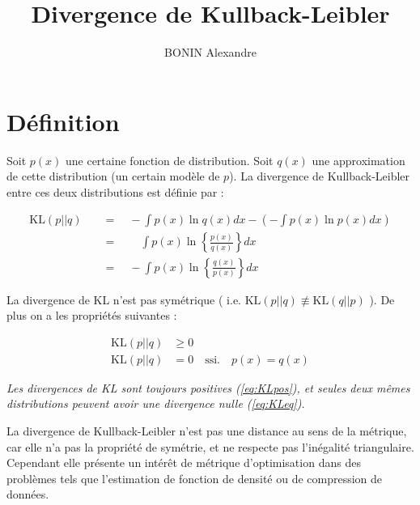 \documentclass[french]{article}
\title{Divergence de Kullback-Leibler}
\author{BONIN Alexandre}
\begin{document}
\maketitle

\tableofcontents

\section{Définition}

Soit $p(x)$ une certaine fonction de distribution. Soit $q(x)$ une approximation de cette distribution (un certain modèle de $p$). La divergence de Kullback-Leibler entre ces deux distributions est définie par :

\begin{align}
\text{KL}(p || q) \quad &= \quad - \int p(x) \ln q(x) dx - \left(- \int p(x) \ln p(x) dx \right) \nonumber\\
&= \quad \quad \int p(x) \ln \left\{ \frac{p(x)}{q(x)} \right\} dx \nonumber \\
&= \quad - \int p(x) \ln \left\{ \frac{q(x)}{p(x)} \right\} dx \label{eq:KL}
\end{align}

La divergence de KL n'est pas symétrique ( i.e. $ \text{KL}(p||q) \not\equiv \text{KL}(q||p) $ ). De plus on a les propriétés suivantes :

\begin{align}
\text{KL}(p||q) &\geq 0 \label{eq:KLpos} \\
\text{KL}(p||q) &= 0 \quad \text{ssi.} \quad p(x) = q(x) \label{eq:KLeq}
\end{align}

\textit{Les divergences de KL sont toujours positives (\ref{eq:KLpos}), et seules deux mêmes distributions peuvent avoir une divergence nulle (\ref{eq:KLeq}).}

La divergence de Kullback-Leibler n'est pas une distance au sens de la métrique, car elle n'a pas la propriété de symétrie, et ne respecte pas l'inégalité triangulaire. Cependant elle présente un intérêt de métrique d'optimisation dans des problèmes tels que l'estimation de fonction de densité ou de compression de données.
\end{document}
